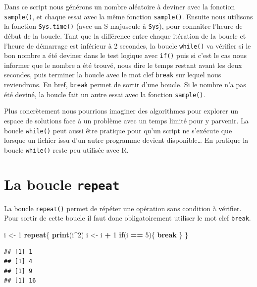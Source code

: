 \documentclass[]{book}
\newenvironment{Shaded}{\begin{snugshade}}{\end{snugshade}}
\newcommand{\ControlFlowTok}[1]{\textcolor[rgb]{0.13,0.29,0.53}{\textbf{#1}}}
\newcommand{\DecValTok}[1]{\textcolor[rgb]{0.00,0.00,0.81}{#1}}
\newcommand{\KeywordTok}[1]{\textcolor[rgb]{0.13,0.29,0.53}{\textbf{#1}}}
\newcommand{\NormalTok}[1]{#1}
\newcommand{\OperatorTok}[1]{\textcolor[rgb]{0.81,0.36,0.00}{\textbf{#1}}}
\newcommand{\StringTok}[1]{\textcolor[rgb]{0.31,0.60,0.02}{#1}}
\begin{document}
Dans ce script nous générons un nombre aléatoire à deviner avec la fonction \texttt{sample()}, et chaque essai avec la même fonction \texttt{sample()}. Ensuite nous utilisons la fonction \texttt{Sys.time()} (avec un S majuscule à \texttt{Sys}), pour connaître l'heure de début de la boucle. Tant que la différence entre chaque itération de la boucle et l'heure de démarrage est inférieur à 2 secondes, la boucle \texttt{while()} va vérifier si le bon nombre a été deviner dans le test logique avec \texttt{if()} puis si c'est le cas nous informer que le nombre a été trouvé, nous dire le temps restant avant les deux secondes, puis terminer la boucle avec le mot clef \texttt{break} sur lequel nous reviendrons. En bref, \texttt{break} permet de sortir d'une boucle. Si le nombre n'a pas été deviné, la boucle fait un autre essai avec la fonction \texttt{sample()}.

Plus concrètement nous pourrions imaginer des algorithmes pour explorer un espace de solutions face à un problème avec un temps limité pour y parvenir. La boucle \texttt{while()} peut aussi être pratique pour qu'un script ne s'exécute que lorsque un fichier issu d'un autre programme devient disponible\ldots{} En pratique la boucle \texttt{while()} reste peu utilisée avec R.

\hypertarget{l17repeat}{%
\section{\texorpdfstring{La boucle \texttt{repeat}}{La boucle repeat}}\label{l17repeat}}

La boucle \texttt{repeat()} permet de répéter une opération sans condition à vérifier. Pour sortir de cette boucle il faut donc obligatoirement utiliser le mot clef \texttt{break}.

\begin{Shaded}
\begin{Highlighting}[]
\NormalTok{i <-}\StringTok{ }\DecValTok{1}
\ControlFlowTok{repeat}\NormalTok{\{}
  \KeywordTok{print}\NormalTok{(i}\OperatorTok{^}\DecValTok{2}\NormalTok{)}
\NormalTok{  i <-}\StringTok{ }\NormalTok{i }\OperatorTok{+}\StringTok{ }\DecValTok{1}
  \ControlFlowTok{if}\NormalTok{(i }\OperatorTok{==}\StringTok{ }\DecValTok{5}\NormalTok{)\{}
    \ControlFlowTok{break}
\NormalTok{  \}}
\NormalTok{\}}
\end{Highlighting}
\end{Shaded}

\begin{verbatim}
## [1] 1
## [1] 4
## [1] 9
## [1] 16
\end{verbatim}
\end{document}

